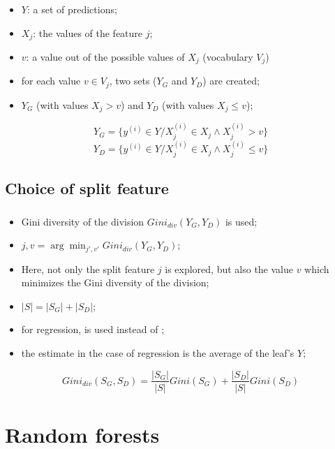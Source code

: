 \documentclass[xcolor=table]{beamer}
\begin{document}
\begin{frame}
	\frametitle{\insertsection}
	\framesubtitle{\insertsubsection}
	
	\begin{itemize}
		\item $Y$: a set of predictions;
		\item $X_j$: the values of the feature $j$;
		\item $v$: a value out of the possible values of $X_j$ (vocabulary $V_j$)
		\item for each value $v \in V_j$, two sets ($Y_G$ and $Y_D$) are created;
		\item $Y_G$ (with values $X_j > v$) and $Y_D$ (with values $X_j \le v$);
	\end{itemize}
	
	\[Y_G = \{y^{(i)} \in Y / X_j^{(i)} \in X_j \wedge X_j^{(i)} > v\}\]
	\[Y_D = \{y^{(i)} \in Y / X_j^{(i)} \in X_j \wedge X_j^{(i)} \le v\}\]
	
\end{frame}

\subsection{Choice of split feature}

\begin{frame}
	\frametitle{\insertsection}
	\framesubtitle{\insertsubsection}
	
	\begin{itemize}
		\item Gini diversity of the division $Gini_{div}(Y_G, Y_D)$ is used;
		\item $j, v = \arg\min_{j', v'} Gini_{div}(Y_G, Y_D)$;
		\item Here, not only the split feature $j$ is explored, but also the value $v$ which minimizes the Gini diversity of the division;
		\item $|S| = |S_G| + |S_D|$;
		\item for regression,  is used instead of ;
		\item the estimate in the case of regression is the average of the leaf's $Y$;
	\end{itemize}
	
	\[Gini_{div}(S_G, S_D) = \frac{|S_G|}{|S|} Gini(S_G) + \frac{|S_D|}{|S|} Gini(S_D)\]
	
	
\end{frame}

\section{Random forests}
\end{document}
